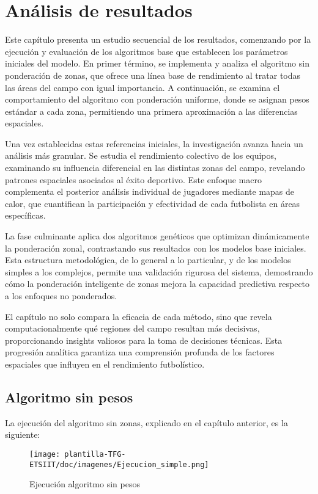 \chapter{Análisis de resultados}

Este capítulo presenta un estudio secuencial de los resultados, comenzando por la ejecución y evaluación de los algoritmos base que establecen los parámetros iniciales del modelo. En primer término, se implementa y analiza el algoritmo sin ponderación de zonas, que ofrece una línea base de rendimiento al tratar todas las áreas del campo con igual importancia. A continuación, se examina el comportamiento del algoritmo con ponderación uniforme, donde se asignan pesos estándar a cada zona, permitiendo una primera aproximación a las diferencias espaciales.

Una vez establecidas estas referencias iniciales, la investigación avanza hacia un análisis más granular. Se estudia el rendimiento colectivo de los equipos, examinando su influencia diferencial en las distintas zonas del campo, revelando patrones espaciales asociados al éxito deportivo. Este enfoque macro complementa el posterior análisis individual de jugadores mediante mapas de calor, que cuantifican la participación y efectividad de cada futbolista en áreas específicas.

La fase culminante aplica dos algoritmos genéticos que optimizan dinámicamente la ponderación zonal, contrastando sus resultados con los modelos base iniciales. Esta estructura metodológica, de lo general a lo particular, y de los modelos simples a los complejos, permite una validación rigurosa del sistema, demostrando cómo la ponderación inteligente de zonas mejora la capacidad predictiva respecto a los enfoques no ponderados.

El capítulo no solo compara la eficacia de cada método, sino que revela computacionalmente qué regiones del campo resultan más decisivas, proporcionando insights valiosos para la toma de decisiones técnicas. Esta progresión analítica garantiza una comprensión profunda de los factores espaciales que influyen en el rendimiento futbolístico.

\section{Algoritmo sin pesos}
La ejecución del algoritmo sin zonas, explicado en el capítulo anterior, es la siguiente:

\begin{figure}[H]
    \centering
    \texttt{[image: plantilla-TFG-ETSIIT/doc/imagenes/Ejecucion\_simple.png]}
    \caption{Ejecución algoritmo sin pesos}
    \label{fig:etiqueta-imagen}
\end{figure}

